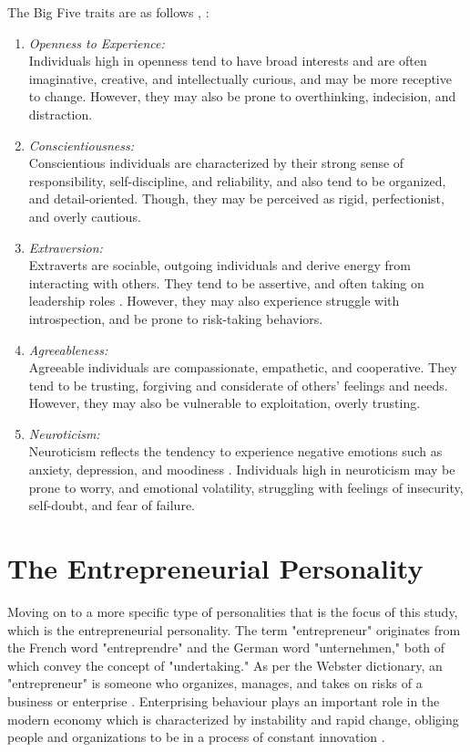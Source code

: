 
The Big Five traits are as follows \cite{bacsaran2021neural}, \cite{antoncic2015big}:\begin{enumerate}
\item \textit{Openness to Experience:}\\
Individuals high in openness tend to have broad interests and are often imaginative, creative, and intellectually curious, and may be more receptive to change. However, they may also be prone to overthinking, indecision, and distraction.

\item \textit{Conscientiousness:}\\
Conscientious individuals are characterized by their strong sense of responsibility, self-discipline, and reliability, and also tend to be organized, and detail-oriented. Though, they may be perceived as rigid, perfectionist, and overly cautious.

\item \textit{Extraversion:}\\
Extraverts are sociable, outgoing individuals and derive energy from interacting with others. They tend to be assertive, and often taking on leadership roles \cite{vinciarelli2014survey}. However, they may also experience struggle with introspection, and be prone to risk-taking behaviors.

\item \textit{Agreeableness:}\\
Agreeable individuals are compassionate, empathetic, and cooperative. They tend to be trusting, forgiving and considerate of others' feelings and needs. However, they may also be vulnerable to exploitation, overly trusting.

\item \textit{Neuroticism:}\\
Neuroticism reflects the tendency to experience negative emotions such as anxiety, depression, and moodiness \cite{vinciarelli2014survey}. Individuals high in neuroticism may be prone to worry, and emotional volatility, struggling with feelings of insecurity, self-doubt, and fear of failure.
\end{enumerate}

\section{The Entrepreneurial Personality}
Moving on to a more specific type of personalities that is the focus of this study, which is the entrepreneurial personality. The term "entrepreneur" originates from the French word "entreprendre" and the German word "unternehmen," both of which convey the concept of "undertaking." As per the Webster dictionary, an "entrepreneur" is someone who organizes, manages, and takes on risks of a business or enterprise \cite{singh2013entrepreneurs}. Enterprising behaviour plays an important role in the modern economy which is characterized by instability and rapid change, obliging people and organizations to be in a process of constant innovation \cite{postigo2021general}.


